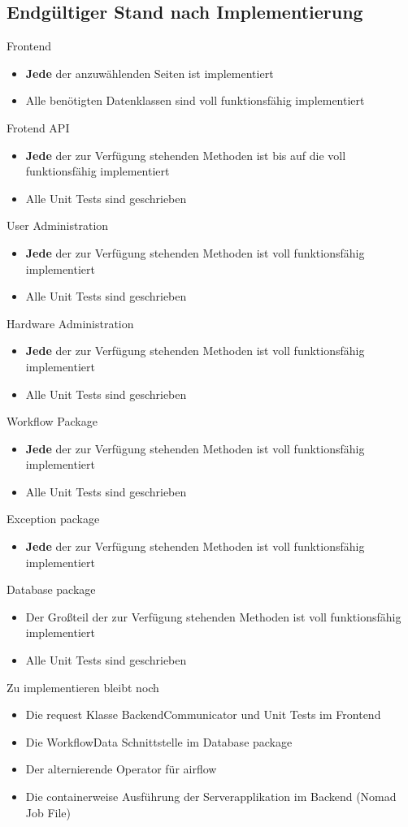 \subsection{Endgültiger Stand nach Implementierung}
Frontend
\begin{itemize}
    \item \textbf{Jede} der anzuwählenden Seiten ist implementiert
    \item Alle benötigten Datenklassen sind voll funktionsfähig implementiert
\end{itemize}
Frotend API
\begin{itemize}
    \item \textbf{Jede} der zur Verfügung stehenden Methoden ist bis auf die  voll funktionsfähig implementiert
    \item Alle Unit Tests sind geschrieben
\end{itemize}
User Administration
\begin{itemize}
    \item \textbf{Jede} der zur Verfügung stehenden Methoden ist voll funktionsfähig implementiert
    \item Alle Unit Tests sind geschrieben
\end{itemize}
Hardware Administration
\begin{itemize}
    \item \textbf{Jede} der zur Verfügung stehenden Methoden ist voll funktionsfähig implementiert
    \item Alle Unit Tests sind geschrieben
\end{itemize}
Workflow Package
\begin{itemize}
    \item \textbf{Jede} der zur Verfügung stehenden Methoden ist voll funktionsfähig implementiert
    \item Alle Unit Tests sind geschrieben
\end{itemize}
Exception package
\begin{itemize}
    \item \textbf{Jede} der zur Verfügung stehenden Methoden ist voll funktionsfähig implementiert
\end{itemize}
Database package
\begin{itemize}
    \item Der Großteil der zur Verfügung stehenden Methoden ist voll funktionsfähig implementiert
    \item Alle Unit Tests sind geschrieben
\end{itemize}
Zu implementieren bleibt noch
\begin{itemize}
    \item Die request Klasse BackendCommunicator und Unit Tests im Frontend
    \item Die WorkflowData Schnittstelle im Database package
    \item Der alternierende Operator für airflow
    \item Die containerweise Ausführung der Serverapplikation im Backend (Nomad Job File)
\end{itemize}